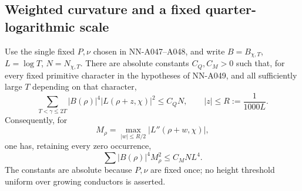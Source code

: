 \subsection*{Weighted curvature and a fixed quarter-logarithmic scale}

\begin{lemma}
\label{lem:A049-weightedcurvature}
Use the single fixed \(P,\nu\) chosen in NN-A047--A048, and
write \(B=B_{\chi,T}\), \(L=\log T\), \(N=N_{\chi,T}\).
There are absolute constants \(C_Q,C_M>0\) such that, for
every fixed primitive character in the hypotheses of NN-A049,
and all sufficiently large \(T\) depending on that character,
\begin{equation}\label{eq:A049-weightedvalue}
 \sum_{T<\gamma\le2T}|B(\rho)|^4|L(\rho+z,\chi)|^2
                  \le C_QN,\qquad |z|\le R:=\frac1{1000L}.
\end{equation}
Consequently, for
\[
             M_\rho=\max_{|w|\le R/2}|L''(\rho+w,\chi)|,
\]
one has, retaining every zero occurrence,
\begin{equation}\label{eq:A049-weightedcurvature}
                  \sum |B(\rho)|^4M_\rho^2\le C_MNL^4.
\end{equation}
The constants are absolute because \(P,\nu\) are fixed once;
no height threshold uniform over growing conductors is asserted.
\end{lemma}

